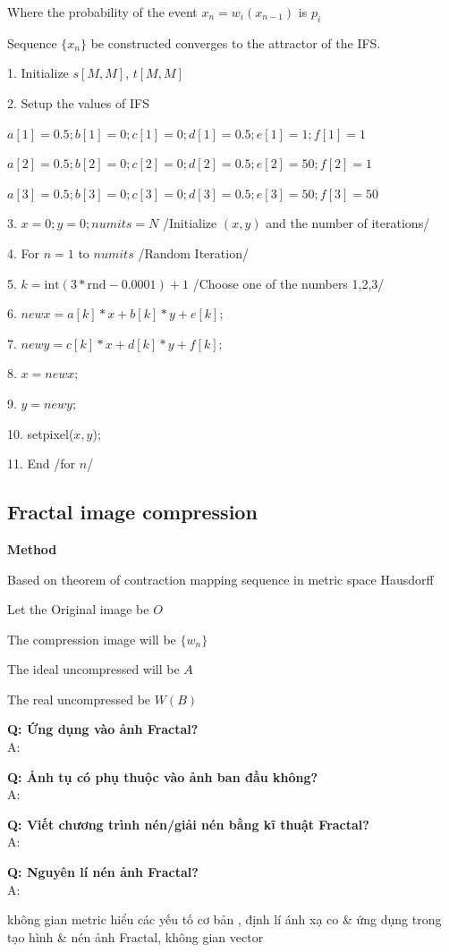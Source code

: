 Where the probability of the event $x_n = w_i(x_{n-1})$ is $p_i$

Sequence $\{x_n\}$ be constructed converges to the attractor of the IFS.

1. Initialize $s[M,M]$, $t[M,M]$

2. Setup the values of IFS

$a[1]=0.5; b[1]=0; c[1]=0; d[1]=0.5; e[1]=1; f[1]=1$

$a[2]=0.5; b[2]=0; c[2]=0; d[2]=0.5; e[2]=50; f[2]=1$

$a[3]=0.5; b[3]=0; c[3]=0; d[3]=0.5; e[3]=50; f[3]=50$

3. $x=0; y=0; numits=N$ /Initialize $(x,y)$ and the number of iterations/

4. For $n=1$ to $numits$ /Random Iteration/

5. $k=\text{int}(3*\text{rnd}-0.0001)+1$ /Choose one of the numbers 1,2,3/

6. $newx=a[k]*x+b[k]*y+e[k];$

7. $newy=c[k]*x+d[k]*y+f[k];$

8. $x= newx;$

9. $y=newy;$

10. setpixel($x,y$);

11. End /for $n$/


\subsection {Fractal image compression}

\textbf{Method}

Based on theorem of contraction mapping sequence in metric space Hausdorff

Let the Original image be $O$

The compression image will be $\{ w_n \}$

The ideal uncompressed will be $A$

The real uncompressed be $W(B)$

\textbf{Q: Ứng dụng vào ảnh Fractal?}\\
A: 

\textbf{Q: Ảnh tụ có phụ thuộc vào ảnh ban đầu không?}\\
A:

\textbf{Q: Viết chương trình nén/giải nén bằng kĩ thuật Fractal?}\\
A: 

\textbf{Q: Nguyên lí nén ảnh Fractal?}\\
A: 


không gian metric hiểu các yếu tố cơ bản
, định lí ánh xạ co \& ứng dụng trong tạo hình \& nén ảnh Fractal, 
không gian vector

